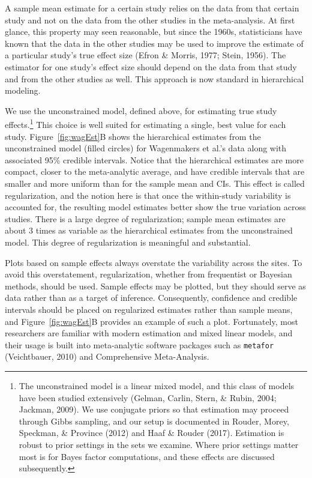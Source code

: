 \documentclass[english,man]{apa6}
\theoremstyle{definition}
\theoremstyle{definition}
\theoremstyle{remark}
\begin{document}
A sample mean estimate for a certain study relies on the data from that
certain study and not on the data from the other studies in the
meta-analysis. At first glance, this property may seen reasonable, but
since the 1960s, statisticians have known that the data in the other
studies may be used to improve the estimate of a particular study's true
effect size (Efron \& Morris, 1977; Stein, 1956). The estimator for one
study's effect size should depend on the data from that study and from
the other studies as well. This approach is now standard in hierarchical
modeling.

We use the unconstrained model, defined above, for estimating true study
effects.\footnote{The unconstrained model is a linear mixed model, and
  this class of models have been studied extensively (Gelman, Carlin,
  Stern, \& Rubin, 2004; Jackman, 2009). We use conjugate priors so that
  estimation may proceed through Gibbs sampling, and our setup is
  documented in Rouder, Morey, Speckman, \& Province (2012) and Haaf \&
  Rouder (2017). Estimation is robust to prior settings in the sets we
  examine. Where prior settings matter most is for Bayes factor
  computations, and these effects are discussed subsequently.} This
choice is well suited for estimating a single, best value for each
study. Figure~\ref{fig:wagEst}B shows the hierarchical estimates from
the unconstrained model (filled circles) for Wagenmakers et al.'s data
along with associated 95\% credible intervals. Notice that the
hierarchical estimates are more compact, closer to the meta-analytic
average, and have credible intervals that are smaller and more uniform
than for the sample mean and CIs. This effect is called regularization,
and the notion here is that once the within-study variability is
accounted for, the resulting model estimates better show the true
variation across studies. There is a large degree of regularization;
sample mean estimates are about 3 times as variable as the hierarchical
estimates from the unconstrained model. This degree of regularization is
meaningful and substantial.

Plots based on sample effects always overstate the variability across
the sites. To avoid this overstatement, regularization, whether from
frequentist or Bayesian methods, should be used. Sample effects may be
plotted, but they should serve as data rather than as a target of
inference. Consequently, confidence and credible intervals should be
placed on regularized estimates rather than sample means, and
Figure~\ref{fig:wagEst}B provides an example of such a plot.
Fortunately, most researchers are familiar with modern estimation and
mixed linear models, and their usage is built into meta-analytic
software packages such as \texttt{metafor} (Veichtbauer, 2010) and
Comprehensive Meta-Analysis.
\end{document}

